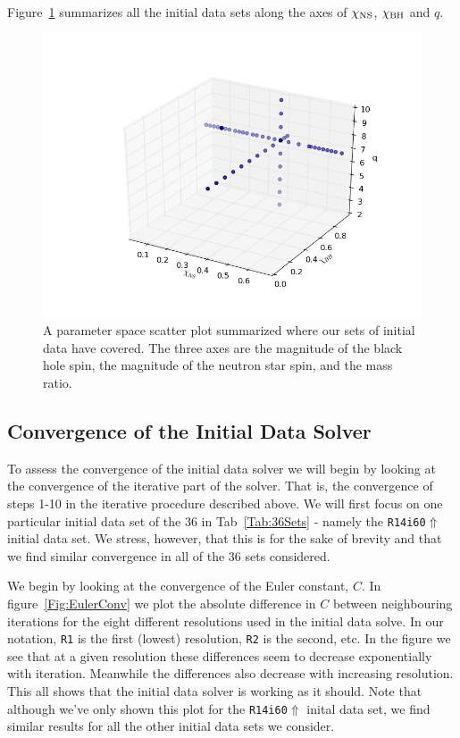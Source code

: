 Figure~\ref{fig:3dparam} summarizes all the initial data sets along the axes of $\chi_{\rm NS}$, $\chi_{\rm BH}$ and $q$.

\begin{figure}
\includegraphics[width=0.95\columnwidth]{chap4/3dparam.png}
\caption[3d parameter space plot of Bh-Ns initial data sets.]{\label{fig:3dparam}
A parameter space scatter plot summarized where our sets of initial data have covered. The three axes are the magnitude of the black hole spin, the magnitude of the neutron star spin, and the mass ratio.}
\end{figure}

\subsection{Convergence of the Initial Data Solver}
To assess the convergence of the initial data solver we will begin by looking at the convergence of the iterative part of the solver. That is, the convergence of steps 1-10 in the iterative procedure
described above. We will first focus on one particular initial data set of the 36 in Tab~\ref{Tab:36Sets} - namely the {\tt R14i60$\Uparrow$} initial data set. We stress, however, that this is for the sake of brevity and that we find similar convergence in all of the 36 sets considered. 

We begin by looking at the convergence of the Euler constant, $C$. In figure~\ref{Fig:EulerConv} we plot the absolute difference in $C$ between neighbouring iterations for the eight
different resolutions used in the initial data solve. In our notation, {\tt R1} is the first (lowest) resolution, {\tt R2} is the second, etc. In the figure we see that at a given resolution these differences
seem to decrease exponentially with iteration. Meanwhile the differences also decrease with increasing resolution. This all shows that the initial data solver is working as it should. Note that although we've only shown
this plot for the {\tt R14i60$\Uparrow$} inital data set, we find similar results for all the other initial data sets we consider.


